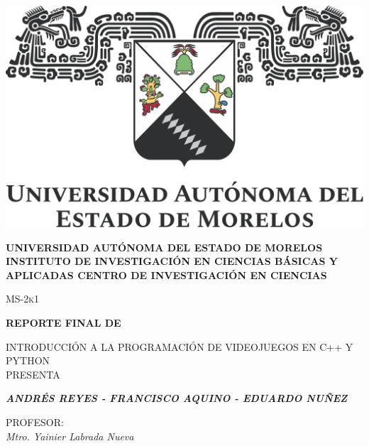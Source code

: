 \documentclass[12pt,letterpaper]{report}
\begin{document}
\begin{titlepage}
\centering
\begin{center}
\includegraphics[scale=0.5]{uaem_logo.png}
\end{center}
\vspace{0.5cm}
{\bfseries\normalsize UNIVERSIDAD AUTÓNOMA DEL ESTADO DE MORELOS\newline
INSTITUTO DE INVESTIGACIÓN EN CIENCIAS BÁSICAS Y APLICADAS\newline 	
CENTRO DE INVESTIGACIÓN EN CIENCIAS
 \par}
\vspace{1.5cm}
{\scshape\Large MS-2k1 \par}
\vspace{1.5cm}
{\bfseries\scshape\Huge REPORTE FINAL DE \par}
\vspace{0.3cm}
{\Large{INTRODUCCIÓN A LA PROGRAMACIÓN DE VIDEOJUEGOS EN C++ Y PYTHON}}\\
\vspace{0.3cm}
\vspace{1cm}
{\Large PRESENTA \\}
\vspace{0.3cm}
{\bfseries\scshape\Large\textit{ANDRÉS REYES - FRANCISCO AQUINO - EDUARDO NUÑEZ}\par}
\vspace{1cm}
\Large PROFESOR: \\
\itshape\Large Mtro. Yainier Labrada Nueva \par

\end{titlepage}

\tableofcontents
%
%
%
%
%
\end{document}
